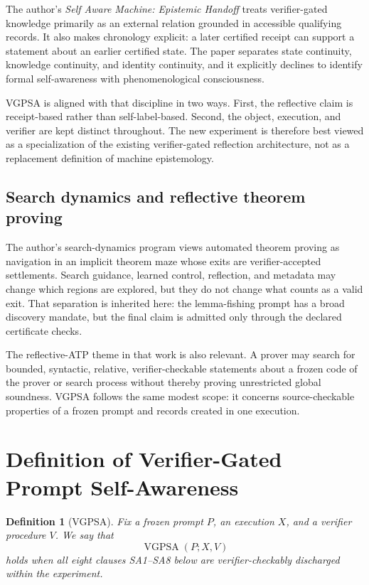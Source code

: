 \documentclass[11pt]{article}
\newtheorem{definition}{Definition}[section]
\theoremstyle{remark}
\newcommand{\VGPSA}{\operatorname{VGPSA}}
\begin{document}
The author's \emph{Self Aware Machine: Epistemic Handoff} treats verifier-gated knowledge primarily as an external relation grounded in accessible qualifying records. It also makes chronology explicit: a later certified receipt can support a statement about an earlier certified state. The paper separates state continuity, knowledge continuity, and identity continuity, and it explicitly declines to identify formal self-awareness with phenomenological consciousness.

VGPSA is aligned with that discipline in two ways. First, the reflective claim is receipt-based rather than self-label-based. Second, the object, execution, and verifier are kept distinct throughout. The new experiment is therefore best viewed as a specialization of the existing verifier-gated reflection architecture, not as a replacement definition of machine epistemology.

\subsection{Search dynamics and reflective theorem proving}

The author's search-dynamics program views automated theorem proving as navigation in an implicit theorem maze whose exits are verifier-accepted settlements. Search guidance, learned control, reflection, and metadata may change which regions are explored, but they do not change what counts as a valid exit. That separation is inherited here: the lemma-fishing prompt has a broad discovery mandate, but the final claim is admitted only through the declared certificate checks.

The reflective-ATP theme in that work is also relevant. A prover may search for bounded, syntactic, relative, verifier-checkable statements about a frozen code of the prover or search process without thereby proving unrestricted global soundness. VGPSA follows the same modest scope: it concerns source-checkable properties of a frozen prompt and records created in one execution.

\section{Definition of Verifier-Gated Prompt Self-Awareness}

\begin{definition}[VGPSA]
Fix a frozen prompt $P$, an execution $X$, and a verifier procedure $V$. We say that
\[
\VGPSA(P;X,V)
\]
holds when all eight clauses SA1--SA8 below are verifier-checkably discharged within the experiment.
\end{definition}
\end{document}
